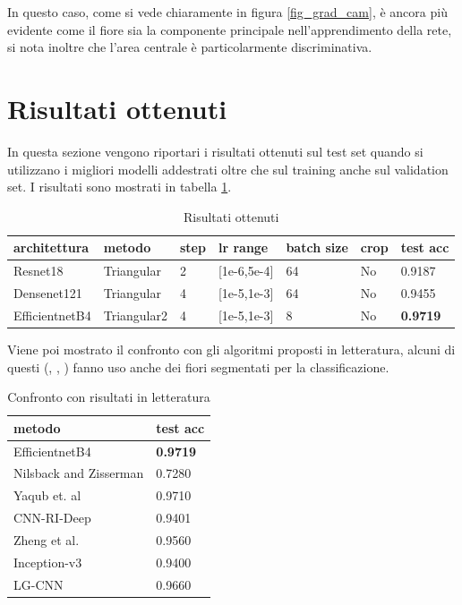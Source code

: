 In questo caso, come si vede chiaramente in figura \ref{fig_grad_cam}, è ancora più evidente come il fiore sia la componente principale nell'apprendimento della rete, si nota inoltre che l'area centrale è particolarmente discriminativa.

\section{Risultati ottenuti}
In questa sezione vengono riportari i risultati ottenuti sul test set quando si utilizzano i migliori modelli addestrati oltre che sul training anche sul validation set. I risultati sono mostrati in tabella \ref{t_res}.
\begin{table}[H]
\centering
\caption{Risultati ottenuti}
\begin{tabular}{|l|l|l|l|l|l|l|}
\hline
\textbf{architettura}   & \textbf{metodo}     & \textbf{step} & \textbf{lr range}        & \textbf{batch size} & \textbf{crop} & \textbf{test acc} \\ \hline
Resnet18       & Triangular  & 2    & {[}1e-6,5e-4{]} & 64         & No   & 0.9187   \\ \hline
Densenet121    & Triangular  & 4    & {[}1e-5,1e-3{]} & 64         & No   & 0.9455   \\ \hline
EfficientnetB4 & Triangular2 & 4    & {[}1e-5,1e-3{]} & 8          & No   & \textbf{0.9719}   \\ \hline
\end{tabular}
\label{t_res}
\end{table}

Viene poi mostrato il confronto con gli algoritmi proposti in letteratura, alcuni di questi (\cite{Nilsback08}, \cite{yaqub}, \cite{XIE2017118}) fanno uso anche dei fiori segmentati per la classificazione.
\begin{table}[H]
\centering
\caption{Confronto con risultati in letteratura}
\begin{tabular}{|l|l|}
\hline
\textbf{metodo}                                           & \textbf{test acc} \\ \hline
EfficientnetB4                                            & \textbf{0.9719}           \\ \hline
Nilsback and Zisserman \cite{Nilsback08} & 0.7280            \\ \hline
Yaqub et. al \cite{yaqub}                & 0.9710            \\ \hline
CNN-RI-Deep \cite{Xie2016TowardsRI}      & 0.9401            \\ \hline
Zheng et al. \cite{zheng2016good}        & 0.9560            \\ \hline
Inception-v3 \cite{7984661}              & 0.9400            \\ \hline
LG-CNN \cite{XIE2017118}                 & 0.9660            \\ \hline
\end{tabular}
\label{t_conf}
\end{table}
